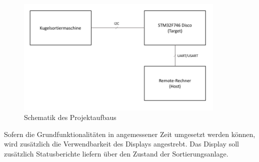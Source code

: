 \begin{figure}[h]
\begin{center}
\includegraphics[width=10cm]{grafiken/Schematik.png}
\caption{Schematik des Projektaufbaus}
\label{schematik_projektaufbau}
\end{center}
\end{figure}
Sofern die Grundfunktionalitäten in angemessener Zeit umgesetzt werden können, wird zusätzlich die Verwendbarkeit des Displays angestrebt. Das Display soll zusätzlich Statusberichte liefern über den Zustand der Sortierungsanlage. 
